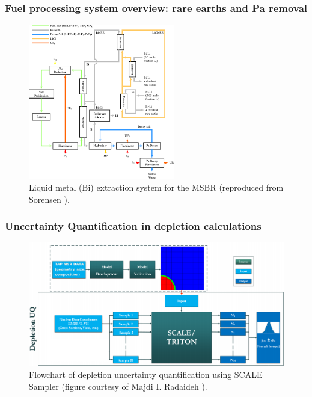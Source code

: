 \documentclass[9pt]{beamer}
\begin{document}
\begin{frame}
\frametitle{Fuel processing system overview: rare earths and Pa removal}
		\vspace{-2mm}
	\begin{figure}[htp!] %
		\centering
			\includegraphics[width=0.57\textwidth]{../dissertation/figures/ch2/flowsheet.pdf}
			\vspace{-2mm}
		\caption{Liquid metal (Bi) extraction system for the \gls{MSBR} 
		(reproduced from Sorensen \cite{sorensen_one-fluid_2006}).} 
	\end{figure}
\end{frame}

\begin{frame}
\frametitle{Uncertainty Quantification in depletion calculations}
\vspace{-2mm}
\begin{figure}[htp!] %
	\centering
	\includegraphics[width=1.05\textwidth]{../dissertation/figures/uq/majdi_scale_scheme.png}
	\vspace{-2mm}
	\caption{Flowchart of depletion uncertainty quantification 
		using SCALE Sampler (figure courtesy of Majdi I. Radaideh 
		\cite{radaideh_novel_2019}).} 
\end{figure}
\end{frame}
\end{document}
